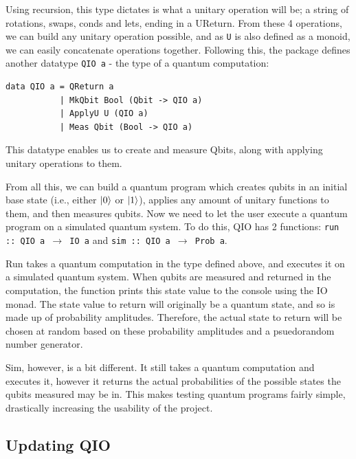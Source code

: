 \documentclass[a4paper,10pt, titlepage, twoside]{article}
\begin{document}
Using recursion, this type dictates is what a unitary operation will be; a string of rotations, swaps, conds and lets, ending in a UReturn. From these 4 operations, we can build any unitary operation possible, and as \texttt{U} is also defined as a monoid, we can easily concatenate operations together. Following this, the package defines another datatype \texttt{QIO a} - the type of a quantum computation:
\begin{verbatim}
data QIO a = QReturn a 
           | MkQbit Bool (Qbit -> QIO a) 
           | ApplyU U (QIO a) 
           | Meas Qbit (Bool -> QIO a)
\end{verbatim}
This datatype enables us to create and measure Qbits, along with applying unitary operations to them.\par
From all this, we can build a quantum program which creates qubits in an initial base state (i.e., either $\ket{0}$ or $\ket{1}$), applies any amount of unitary functions to them, and then measures qubits. Now we need to let the user execute a quantum program on a simulated quantum system. To do this, QIO has 2 functions: \texttt{run :: QIO a $\to$ IO a} and \texttt{sim :: QIO a $\to$ Prob a}.\par
Run takes a quantum computation in the type defined above, and executes it on a simulated quantum system. When qubits are measured and returned in the computation, the function prints this state value to the console using the IO monad. The state value to return will originally be a quantum state, and so is made up of probability amplitudes. Therefore, the actual state to return will be chosen at random based on these probability amplitudes and a psuedorandom number generator.\par
Sim, however, is a bit different. It still takes a quantum computation and executes it, however it returns the actual probabilities of the possible states the qubits measured may be in. This makes testing quantum programs fairly simple, drastically increasing the usability of the project. 

\subsection{Updating QIO}
\end{document}
